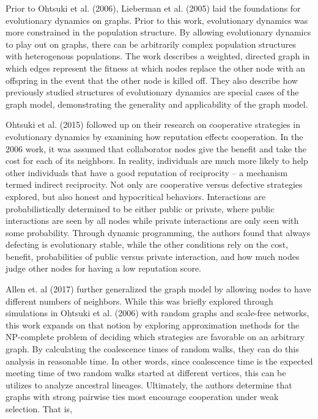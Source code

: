 \documentclass[11pt]{article}
\begin{document}
Prior to Ohtsuki et al. (2006), Lieberman et al. (2005) laid the foundations for evolutionary dynamics on graphs. Prior to this work, evolutionary dynamics was more constrained in the population structure. By allowing evolutionary dynamics to play out on graphs, there can be arbitrarily complex population structures with heterogenous populations. The work describes a weighted, directed graph in which edges represent the fitness at which nodes replace the other node with an offspring in the event that the other node is killed off. They also describe how previously studied structures of evolutionary dynamics are special cases of the graph model, demonstrating the generality and applicability of the graph model. 

Ohtsuki et al. (2015) followed up on their research on cooperative strategies in evolutionary dynamics by examining how reputation effects cooperation. In the 2006 work, it was assumed that collaborator nodes give the benefit and take the cost for each of its neighbors. In reality, individuals are much more likely to help other individuals that have a good reputation of reciprocity -- a mechanism termed indirect reciprocity. Not only are cooperative versus defective strategies explored, but also honest and hypocritical behaviors. Interactions are probabilistically determined to be either public or private, where public interactions are seen by all nodes while private interactions are only seen with some probability. Through dynamic programming, the authors found that always defecting is evolutionary stable, while the other conditions rely on the cost, benefit, probabilities of public versus private interaction, and how much nodes judge other nodes for having a low reputation score.  

Allen et. al (2017) further generalized the graph model by allowing nodes to have different numbers of neighbors. While this was briefly explored through simulations in Ohtsuki et al. (2006) with random graphs and scale-free networks, this work expands on that notion by exploring approximation methods for the NP-complete problem of deciding which strategies are favorable on an arbitrary graph. By calculating the coalescence times of random walks, they can do this analysis in reasonable time. In other words, since coalescence time is the expected meeting time of two random walks started at different vertices, this can be utilizes to analyze ancestral lineages. Ultimately, the authors determine that graphs with strong pairwise ties most encourage cooperation under weak selection. That is, 
\end{document}
